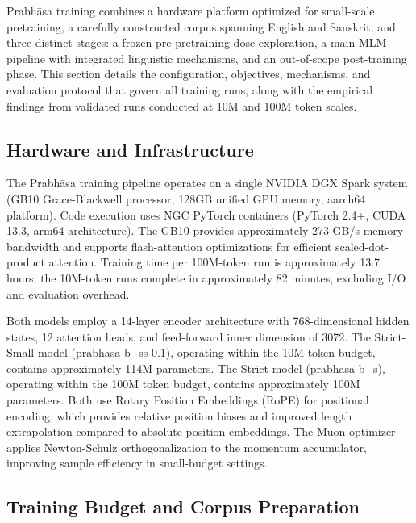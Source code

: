 
Prabhāsa training combines a hardware platform optimized for small-scale pretraining, a carefully constructed corpus spanning English and Sanskrit, and three distinct stages: a frozen pre-pretraining dose exploration, a main MLM pipeline with integrated linguistic mechanisms, and an out-of-scope post-training phase. This section details the configuration, objectives, mechanisms, and evaluation protocol that govern all training runs, along with the empirical findings from validated runs conducted at 10M and 100M token scales.

\subsection{Hardware and Infrastructure}

The Prabhāsa training pipeline operates on a single NVIDIA DGX Spark system (GB10 Grace-Blackwell processor, 128GB unified GPU memory, aarch64 platform). Code execution uses NGC PyTorch containers (PyTorch 2.4+, CUDA 13.3, arm64 architecture). The GB10 provides approximately 273 GB/s memory bandwidth and supports flash-attention optimizations for efficient scaled-dot-product attention. Training time per 100M-token run is approximately 13.7 hours; the 10M-token runs complete in approximately 82 minutes, excluding I/O and evaluation overhead.

Both models employ a 14-layer encoder architecture with 768-dimensional hidden states, 12 attention heads, and feed-forward inner dimension of 3072. The Strict-Small model (prabhasa-b\_ss-0.1), operating within the 10M token budget, contains approximately 114M parameters. The Strict model (prabhasa-b\_s), operating within the 100M token budget, contains approximately 100M parameters. Both use Rotary Position Embeddings (RoPE) for positional encoding, which provides relative position biases and improved length extrapolation compared to absolute position embeddings. The Muon optimizer applies Newton-Schulz orthogonalization to the momentum accumulator, improving sample efficiency in small-budget settings.

\subsection{Training Budget and Corpus Preparation}

